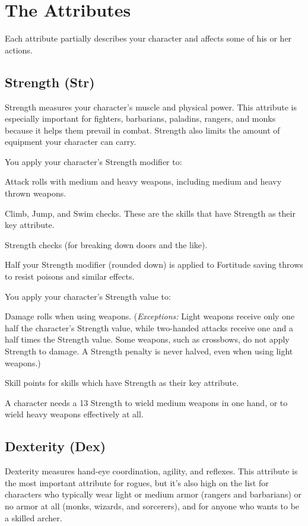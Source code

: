 \section{The Attributes}
Each attribute partially describes your character and affects some of his or her actions.

\subsection{Strength (Str)}
Strength measures your character's muscle and physical power. This attribute is especially important for fighters, barbarians, paladins, rangers, and monks because it helps them prevail in combat. Strength also limits the amount of equipment your character can carry.

You apply your character's Strength modifier to:
\begin{itemize*}
\item Attack rolls with medium and heavy weapons, including medium and heavy thrown weapons.
\item Climb, Jump, and Swim checks. These are the skills that have Strength as their key attribute.
\item Strength checks (for breaking down doors and the like).
\item Half your Strength modifier (rounded down) is applied to Fortitude saving throws to resist poisons and similar effects.
\end{itemize*}
You apply your character's Strength value to:
\begin{itemize*}
\item Damage rolls when using weapons. (\emph{Exceptions:} Light weapons receive only one half the character's Strength value, while two-handed attacks receive one and a half times the Strength value. Some weapons, such as crossbows, do not apply Strength to damage. A Strength penalty is never halved, even when using light weapons.)
\item Skill points for skills which have Strength as their key attribute.
\end{itemize*}
\par A character needs a 13 Strength to wield medium weapons in one hand, or to wield heavy weapons effectively at all.

\subsection{Dexterity (Dex)}
Dexterity measures hand-eye coordination, agility, and reflexes. This attribute is the most important attribute for rogues, but it's also high on the list for characters who typically wear light or medium armor (rangers and barbarians) or no armor at all (monks, wizards, and sorcerers), and for anyone who wants to be a skilled archer.

